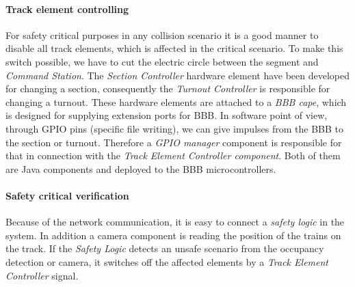 \paragraph{Track element controlling}\label{par:FunctionTEC}
For safety critical purposes in any collision scenario it is a good manner to disable all track elements, which is affected in the critical scenario. To make this switch possible, we have to cut the electric circle between the segment and \textit{Command Station}. The \textit{Section Controller} hardware element have been developed for changing a section, consequently the \textit{Turnout Controller} is responsible for changing a turnout. These hardware elements are attached to a \textit{BBB cape}, which is designed for supplying extension ports for BBB. In software point of view, through GPIO pins (specific file writing), we can give impulses from the BBB to the section or turnout. Therefore a \textit{GPIO manager} component is responsible for that in connection with the \textit{Track Element Controller component}. Both of them are Java components and deployed to the BBB microcontrollers.

\paragraph{Safety critical verification}
Because of the network communication, it is easy to connect a \textit{safety logic} in the system. In addition a camera component is reading the position of the trains on the track. If the \textit{Safety Logic} detects an unsafe scenario from the occupancy detection or camera, it switches off the affected elements by a \textit{Track Element Controller} signal.
